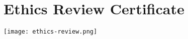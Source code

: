 \chapter{Ethics Review Certificate}
\begin{center}
    \texttt{[image: ethics-review.png]}
    \label{fig:ethics-review}
\end{center}